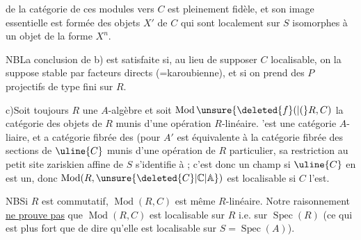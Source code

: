 de la catégorie de ces modules vers $C$ est pleinement fidèle, et son image essentielle est formée des objets $X'$ de $C$ qui sont localement sur $S$ isomorphes à un objet de la forme $X^n$.

NB\quad La conclusion de b) est satisfaite si, au lieu de supposer $C$ localisable, on la suppose stable par facteurs directs (=karoubienne), et  si on prend des $P$ projectifs de type fini sur $R$.

c)\quad Soit toujours $R$ une $A$-algèbre et soit $\operatorname{Mod}\unsure{\deleted{f}(|(}R,C)$ la catégorie des objets de $R$ munis d'une opération $R$-linéaire. 'est une catégorie $A$-liaire, et a catégorie fibrée des
(pour $A'$   est équivalente à la catégorie fibrée des sections de $\uline{C}$ munis d'une opération de $R$  particulier, sa restriction au  petit site zariskien affine de $S$  s'identifie à
; c'est donc un champ si $\uline{C}$ en est un, donc $\operatorname{Mod}(R,\unsure{\deleted{C}|\mathbb{C}|\mathbb{A}})$ est localisable  si $C$ l'est.

NB\quad Si $R$ est commutatif, $\operatorname{Mod}(R,C)$ est même $R$-linéaire. Notre raisonnement \uline{ne prouve pas} que  $\operatorname{Mod}(R,C)$ est localisable sur $R$ i.e. sur $\operatorname{Spec}(R)$ (ce qui est plus fort que de dire qu'elle est localisable sur $S=\operatorname{Spec}(A)$).

